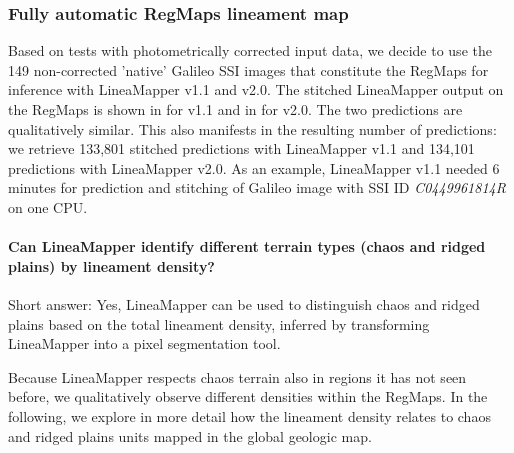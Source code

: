 \subsubsection{Fully automatic RegMaps lineament map}\label{sec:fullRegMaps}

Based on tests with photometrically corrected input data, we decide to use the 149 non-corrected 'native' Galileo SSI images that constitute the RegMaps for inference with LineaMapper v1.1 and v2.0. The stitched LineaMapper output on the RegMaps is shown in  for v1.1 and in  for v2.0. The two predictions are qualitatively similar. This also manifests in the resulting number of predictions: we retrieve 133,801 stitched predictions with LineaMapper v1.1 and 134,101 predictions with LineaMapper v2.0. As an example, LineaMapper v1.1 needed 6 minutes for prediction and stitching of Galileo image with SSI ID \textit{C0449961814R} on one CPU. 



\paragraph{\textbf{Can LineaMapper identify different terrain types (chaos and ridged plains) by lineament density?}}\label{sec:Q1LM_terraintypes}
Short answer: Yes, LineaMapper can be used to distinguish chaos and ridged plains based on the total lineament density, inferred by transforming LineaMapper into a pixel segmentation tool.


Because LineaMapper respects chaos terrain also in regions it has not seen before, we qualitatively observe different densities within the RegMaps. In the following, we explore in more detail how the lineament density relates to chaos and ridged plains units mapped in the global geologic map. 

